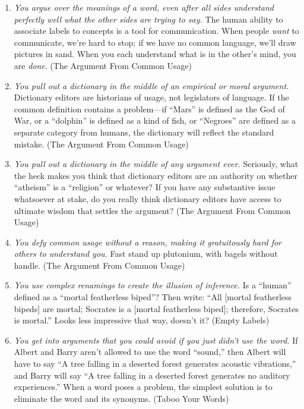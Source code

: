 \begin{enumerate}
\item {
 \textit{You argue over the meanings of a word, even after all
sides understand perfectly well what the other sides are trying to
say.} The human ability to associate labels to concepts is a tool for
communication. When people \textit{want} to communicate,
we're hard to stop; if we have no common language,
we'll draw pictures in sand. When you each understand
what is in the other's mind, you are \textit{done}.
(The Argument From Common Usage)}

\item {
 \textit{You pull out a dictionary in the middle of an empirical or
moral argument.} Dictionary editors are historians of usage, not
legislators of language. If the common definition contains a
problem---if ``Mars'' is defined as
the God of War, or a ``dolphin'' is
defined as a kind of fish, or
``Negroes'' are defined as a
separate category from humans, the dictionary will reflect the standard
mistake. (The Argument From Common Usage)}

\item {
 \textit{You pull out a dictionary in the middle of any argument
ever.} Seriously, what the heck makes you think that dictionary editors
are an authority on whether
``atheism'' is a
``religion'' or whatever? If you
have any substantive issue whatsoever at stake, do you really think
dictionary editors have access to ultimate wisdom that settles the
argument? (The Argument From Common Usage)}

\item {
 \textit{You defy common usage without a reason, making it
gratuitously hard for others to understand you.} Fast stand up
plutonium, with bagels without handle. (The Argument From Common
Usage)}

\item {
 \textit{You use complex renamings to create the illusion of
inference.} Is a ``human'' defined
as a ``mortal featherless biped''?
Then write: ``All [mortal featherless bipeds] are
mortal; Socrates is a [mortal featherless biped]; therefore, Socrates
is mortal.'' Looks less impressive that way,
doesn't it? (Empty Labels)}

\item {
 \textit{You get into arguments that you could avoid if you just
didn't use the word.} If Albert and Barry
aren't allowed to use the word
``sound,'' then Albert will have to
say ``A tree falling in a deserted forest generates
acoustic vibrations,'' and Barry will say
``A tree falling in a deserted forest generates no
auditory experiences.'' When a word poses a problem,
the simplest solution is to eliminate the word and its synonyms. (Taboo
Your Words)}


\end{enumerate}
